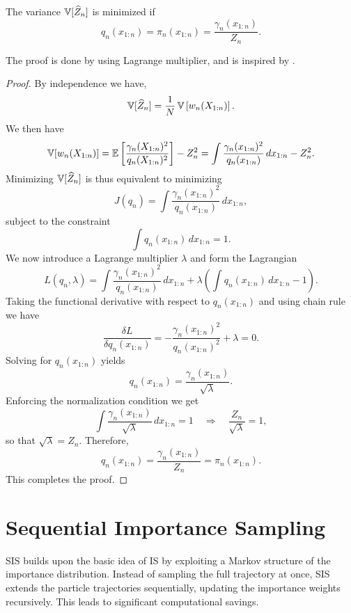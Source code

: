 \begin{theorem}
	\label{thm:min_var_IS}
	The variance \(\operatorname{\mathbb{V}}[\widehat{Z}_n]\) is minimized if
	\[
	q_n(x_{1:n}) = \pi_n(x_{1:n}) = \frac{\gamma_n(x_{1:n})}{Z_n}.
	\]
\end{theorem}
The proof is done by using Lagrange multiplier, and is inspired by \cite{min_var_IS}.
\begin{proof}
	By independence we have, 
	\[
	\operatorname{\mathbb{V}}[\widehat{Z}_n] = \frac{1}{N}\operatorname{\mathbb{V}}\left[w_n(X_{1:n})\right].
	\]
	We then have   
	\[
	\operatorname{\mathbb{V}}[w_n(X_{1:n})] = \mathbb{E}\left[\frac{\gamma_n(X_{1:n})^2}{q_n(X_{1:n})^2}\right] - Z_n^2
	= \int \frac{\gamma_n(x_{1:n})^2}{q_n(x_{1:n})}\, dx_{1:n} - Z_n^2.
	\]
	Minimizing \(\operatorname{\mathbb{V}}[\widehat{Z}_n]\) is thus equivalent to minimizing
	\[
	J(q_n) = \int \frac{\gamma_n(x_{1:n})^2}{q_n(x_{1:n})}\, dx_{1:n},
	\]
	subject to the constraint
	\[
	\int q_n(x_{1:n})\, dx_{1:n} = 1.
	\]
	We now introduce a Lagrange multiplier \(\lambda\) and form the Lagrangian
	\[
	L(q_n, \lambda) = \int \frac{\gamma_n(x_{1:n})^2}{q_n(x_{1:n})}\, dx_{1:n} 
	+ \lambda \left(\int q_n(x_{1:n})\, dx_{1:n} - 1\right).
	\]
	Taking the functional derivative with respect to \(q_n(x_{1:n})\) and using chain rule we have
	\[
	\frac{\delta L}{\delta q_n(x_{1:n})} = -\frac{\gamma_n(x_{1:n})^2}{q_n(x_{1:n})^2} + \lambda = 0.
	\]
	Solving for \(q_n(x_{1:n})\) yields
	\[
	q_n(x_{1:n}) = \frac{\gamma_n(x_{1:n})}{\sqrt{\lambda}}.
	\]
	Enforcing the normalization condition we get
	\[
	\int \frac{\gamma_n(x_{1:n})}{\sqrt{\lambda}}\, dx_{1:n} = 1 \quad\Longrightarrow\quad \frac{Z_n}{\sqrt{\lambda}} = 1,
	\]
	so that \(\sqrt{\lambda} = Z_n\). Therefore,
	\[
	q_n(x_{1:n}) = \frac{\gamma_n(x_{1:n})}{Z_n} = \pi_n(x_{1:n}).
	\]
	This completes the proof.
\end{proof}
\section{Sequential Importance Sampling}
\Gls*{SIS} builds upon the basic idea of \gls*{IS} by exploiting a Markov structure of the importance distribution. Instead of sampling the full trajectory at once, \gls*{SIS} extends the particle trajectories sequentially, updating the importance weights recursively. This leads to significant computational savings.

